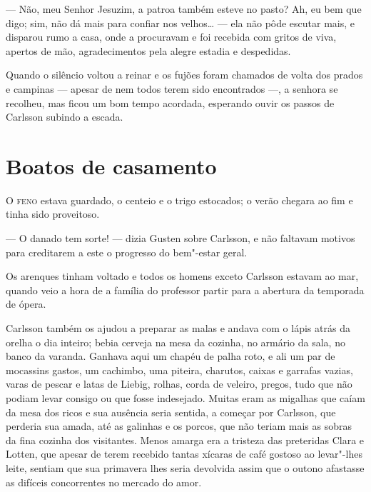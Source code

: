 --- Não, meu Senhor Jesuzim, a patroa também esteve no pasto? Ah, eu bem que digo; sim,
não dá mais para confiar nos velhos\ldots{} --- ela não pôde escutar mais, e
disparou rumo a casa, onde a procuravam e foi recebida com gritos de viva,
apertos de mão, agradecimentos pela alegre estadia e despedidas.

Quando o silêncio voltou a reinar e os fujões foram chamados de volta
dos prados e campinas --- apesar de nem todos terem sido encontrados ---, a senhora se
recolheu, mas ficou um bom tempo acordada, esperando ouvir os passos de
Carlsson subindo a escada.

\chapter[Boatos de casamento\ldots]{Boatos de casamento}

\textsc{O feno} estava guardado, o centeio e o trigo estocados; o verão chegara
ao fim e tinha sido proveitoso.

--- O danado tem sorte! --- dizia Gusten sobre Carlsson, e não faltavam motivos
para creditarem a este o progresso do bem"-estar geral.

Os arenques tinham voltado e todos os homens exceto Carlsson estavam ao mar,
quando veio a hora de a família do professor partir para a abertura da temporada
de ópera.

Carlsson também os ajudou a preparar as malas e andava com o lápis atrás da
orelha o dia inteiro; bebia cerveja na mesa da cozinha, no armário da sala, no
banco da varanda. Ganhava aqui um chapéu de palha roto, e ali um par de
mocassins gastos, um cachimbo, uma piteira, charutos, caixas e garrafas vazias,
varas de pescar e latas de Liebig, rolhas, corda de veleiro, pregos, tudo que
não podiam levar consigo ou que fosse indesejado. Muitas eram as migalhas 
que caíam da mesa dos ricos e sua ausência seria sentida, a começar por Carlsson, que
perderia sua amada, até as galinhas e os porcos, que não teriam mais as sobras da
fina cozinha dos visitantes. Menos amarga era a tristeza das preteridas Clara e
Lotten, que apesar de terem recebido tantas xícaras de café gostoso ao
levar"-lhes leite, sentiam que sua primavera lhes seria devolvida assim que o
outono afastasse as difíceis concorrentes no mercado do amor.

